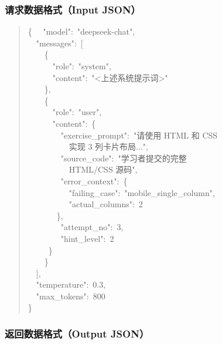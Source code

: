 \begin{appendices}
\subsubsection*{请求数据格式（Input JSON）}

\begin{quote}\small\ttfamily
\{
\ \ "model":\ "deepseek-chat",\\
\ \ "messages":\ [\\
\ \ \ \ \{\\
\ \ \ \ \ \ "role":\ "system",\\
\ \ \ \ \ \ "content":\ "<上述系统提示词>"\\
\ \ \ \ \},\\
\ \ \ \ \{\\
\ \ \ \ \ \ "role":\ "user",\\
\ \ \ \ \ \ "content":\ \{\\
\ \ \ \ \ \ \ \ "exercise\_prompt":\ "请使用 HTML 和 CSS\\
\ \ \ \ \ \ \ \ \ \ 实现 3 列卡片布局...",\\
\ \ \ \ \ \ \ \ "source\_code":\ "学习者提交的完整\\
\ \ \ \ \ \ \ \ \ \ HTML/CSS 源码",\\
\ \ \ \ \ \ \ \ "error\_context":\ \{\\
\ \ \ \ \ \ \ \ \ \ "failing\_case":\ "mobile\_single\_column",\\
\ \ \ \ \ \ \ \ \ \ "actual\_columns":\ 2\\
\ \ \ \ \ \ \ \},\\
\ \ \ \ \ \ \ \ "attempt\_no":\ 3,\\
\ \ \ \ \ \ \ \ "hint\_level":\ 2\\
\ \ \ \ \ \}\\
\ \ \ \ \}\\
\ \ ],\\
\ \ "temperature":\ 0.3,\\
\ \ "max\_tokens":\ 800\\
\}
\end{quote}

\subsubsection*{返回数据格式（Output JSON）}


\end{appendices}
